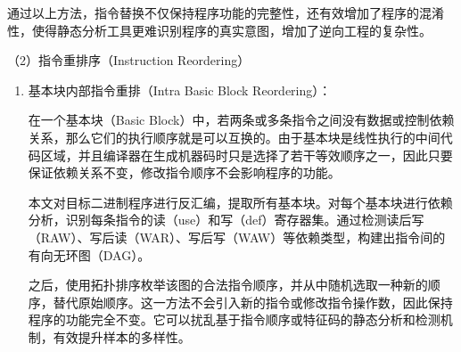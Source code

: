 通过以上方法，指令替换不仅保持程序功能的完整性，还有效增加了程序的混淆性，使得静态分析工具更难识别程序的真实意图，增加了逆向工程的复杂性。


（2）指令重排序（Instruction Reordering）

\begin{enumerate}


\item 基本块内部指令重排（Intra Basic Block Reordering）：


在一个基本块（Basic Block）中，若两条或多条指令之间没有数据或控制依赖关系，那么它们的执行顺序就是可以互换的。由于基本块是线性执行的中间代码区域，并且编译器在生成机器码时只是选择了若干等效顺序之一，因此只要保证依赖关系不变，修改指令顺序不会影响程序的功能。


本文对目标二进制程序进行反汇编，提取所有基本块。对每个基本块进行依赖分析，识别每条指令的读（use）和写（def）寄存器集。通过检测读后写（RAW）、写后读（WAR）、写后写（WAW）等依赖类型，构建出指令间的有向无环图（DAG）。


之后，使用拓扑排序枚举该图的合法指令顺序，并从中随机选取一种新的顺序，替代原始顺序。这一方法不会引入新的指令或修改指令操作数，因此保持程序的功能完全不变。它可以扰乱基于指令顺序或特征码的静态分析和检测机制，有效提升样本的多样性。


\end{enumerate}
